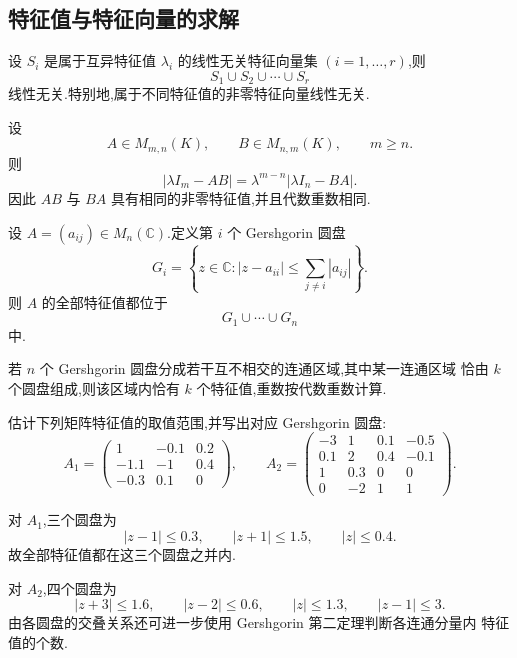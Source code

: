 \subsection{特征值与特征向量的求解}

\begin{theorem}[\markstar]
设 $S_i$ 是属于互异特征值 $\lambda_i$ 的线性无关特征向量集
$(i=1,\ldots,r)$,则
\[
S_1\cup S_2\cup\cdots\cup S_r
\]
线性无关.特别地,属于不同特征值的非零特征向量线性无关.
\end{theorem}


\begin{proposition}[\markstar]
设
\[
A\in M_{m,n}(K),\qquad
B\in M_{n,m}(K),\qquad m\geq n.
\]
则
\[
|\lambda I_m-AB|
=
\lambda^{m-n}|\lambda I_n-BA|.
\]
因此 $AB$ 与 $BA$ 具有相同的非零特征值,并且代数重数相同.
\end{proposition}


\begin{theorem}[\markstar]
设 $A=(a_{ij})\in M_n(\mathbb{C})$.定义第 $i$ 个 Gershgorin 圆盘
\[
G_i=
\left\{
z\in\mathbb{C}:
|z-a_{ii}|
\leq
\sum\limits_{j\neq i}|a_{ij}|
\right\}.
\]
则 $A$ 的全部特征值都位于
\[
G_1\cup\cdots\cup G_n
\]
中.
\end{theorem}


\begin{theorem}[\markstar]
若 $n$ 个 Gershgorin 圆盘分成若干互不相交的连通区域,其中某一连通区域
恰由 $k$ 个圆盘组成,则该区域内恰有 $k$ 个特征值,重数按代数重数计算.
\end{theorem}


\begin{example}
估计下列矩阵特征值的取值范围,并写出对应 Gershgorin 圆盘:
\[
A_1=
\begin{pmatrix}
1&-0.1&0.2\\
-1.1&-1&0.4\\
-0.3&0.1&0
\end{pmatrix},
\qquad
A_2=
\begin{pmatrix}
-3&1&0.1&-0.5\\
0.1&2&0.4&-0.1\\
1&0.3&0&0\\
0&-2&1&1
\end{pmatrix}.
\]
\end{example}
\exampleblank

\begin{solution}
对 $A_1$,三个圆盘为
\[
|z-1|\leq0.3,\qquad
|z+1|\leq1.5,\qquad
|z|\leq0.4.
\]
故全部特征值都在这三个圆盘之并内.

对 $A_2$,四个圆盘为
\[
|z+3|\leq1.6,\qquad
|z-2|\leq0.6,\qquad
|z|\leq1.3,\qquad
|z-1|\leq3.
\]
由各圆盘的交叠关系还可进一步使用 Gershgorin 第二定理判断各连通分量内
特征值的个数.
\end{solution}


